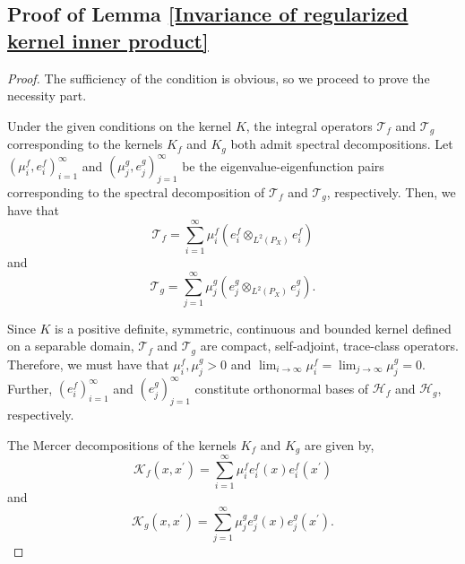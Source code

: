 \documentclass[11pt]{article}
\newcommand{\Hf}{\mathcal{H}_{f}}
\newcommand{\Hg}{\mathcal{H}_{g}}
\newcommand{\LPtwo}{L^{2}(P_{X})}
\theoremstyle{plain}
\begin{document}
\subsection{Proof of Lemma \ref{Invariance of regularized kernel inner product}}\label{Proof Lemma 2}

\begin{proof}
    The sufficiency of the condition is obvious, so we proceed to prove the necessity part.

    Under the given conditions on the kernel $K$, the integral operators $\mathcal{T}_{f}$ and $\mathcal{T}_{g}$ corresponding to the kernels $K_{f}$ and $K_{g}$ both admit spectral decompositions. Let $\left(\mu_{i}^{f},e_{i}^{f}\right)_{i=1}^{\infty}$ and $\left(\mu_{j}^{g},e_{j}^{g}\right)_{j=1}^{\infty}$ be the eigenvalue-eigenfunction pairs corresponding to the spectral decomposition of $\mathcal{T}_{f}$ and $\mathcal{T}_{g}$, respectively. Then, we have that
    \begin{equation*}\label{Spectral decomposition of Tf}
        \mathcal{T}_{f} = \sum_{i=1}^{\infty} \mu_{i}^{f} \left(e_{i}^{f} \otimes_{\LPtwo} e_{i}^{f}\right)
    \end{equation*}
    and
    \begin{equation*}\label{Spectral decomposition of Tg}
        \mathcal{T}_{g} = \sum_{j=1}^{\infty} \mu_{j}^{g} \left(e_{j}^{g} \otimes_{\LPtwo} e_{j}^{g}\right).
    \end{equation*}

    Since $K$ is a positive definite, symmetric, continuous and bounded kernel defined on a separable domain, $\mathcal{T}_{f}$ and $\mathcal{T}_{g}$ are compact, self-adjoint, trace-class operators. Therefore, we must have that $\mu_{i}^{f},\mu_{j}^{g} > 0$ and $\lim_{i \to \infty} \mu_{i}^{f} = \lim_{j \to \infty} \mu_{j}^{g} = 0$. Further, $(e_{i}^{f})_{i=1}^{\infty}$ and $(e_{j}^{g})_{j=1}^{\infty}$ constitute orthonormal bases of $\Hf$ and $\Hg$, respectively.

    The Mercer decompositions of the kernels $K_{f}$ and $K_{g}$ are given by,
    \begin{equation*}\label{Mercer decomposition of Kf}
        \mathcal{K}_{f}(x,x^{\prime}) = \sum_{i=1}^{\infty} \mu_{i}^{f} e_{i}^{f}(x) e_{i}^{f}(x^{\prime})
    \end{equation*}
    and 
    \begin{equation*}\label{Mercer decomposition of Kg}
        \mathcal{K}_{g}(x,x^{\prime}) = \sum_{j=1}^{\infty} \mu_{j}^{g} e_{j}^{g}(x) e_{j}^{g}(x^{\prime}).
    \end{equation*}


\end{proof}
\end{document}
